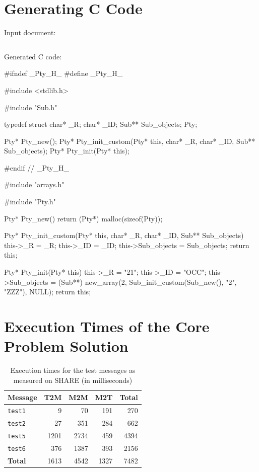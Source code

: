\section{Generating C Code}
\label{sec:AppendixGeneratingCCode}

Input document:

\inputminted[fontsize=\fontsize{8}{8},linenos,numbersep=5pt,frame=lines,framesep=2mm]{xml}{listings/example-for-c-code.xml}

\noindent Generated C code:

\begin{ccode}
#ifndef _Pty_H_
#define _Pty_H_

#include <stdlib.h>

#include "Sub.h"

typedef struct {
  char* _R;
  char* _ID;
  Sub** Sub_objects;
} Pty;

Pty* Pty_new();
Pty* Pty_init_custom(Pty* this, char* _R, char* _ID, Sub** Sub_objects);
Pty* Pty_init(Pty* this);

#endif // _Pty_H_	
\end{ccode}
%
\begin{ccode}
#include "arrays.h"

#include "Pty.h"

Pty* Pty_new() {
  return (Pty*) malloc(sizeof(Pty));
}

Pty* Pty_init_custom(Pty* this, char* _R, char* _ID, Sub** Sub_objects) {
  this->_R = _R;
  this->_ID = _ID;
  this->Sub_objects = Sub_objects;
  return this;
}

Pty* Pty_init(Pty* this) {
  this->_R = "21";
  this->_ID = "OCC";
  this->Sub_objects = (Sub**) new_array(2, Sub_init_custom(Sub_new(), "2", "ZZZ"), NULL);
  return this;
}
\end{ccode}

\section{Execution Times of the Core Problem Solution}
\label{sec:AppendixExecutionTime}

\begin{table}[h!]
  \centering
  \begin{tabular}{ l | r | r | r | r }
    \hline
    \textbf{Message} & \textbf{T2M} & \textbf{M2M} & \textbf{M2T} & \textbf{Total} \\
    \hline
    \texttt{test1}   & 9      & 70     & 191   & 270  \\
    \texttt{test2}   & 27     & 351    & 284   & 662  \\
    \texttt{test5}   & 1201   & 2734   & 459   & 4394 \\
    \texttt{test6}   & 376    & 1387   & 393   & 2156 \\
    \hline
    \textbf{Total}   & 1613   & 4542   & 1327  & 7482 \\
    \hline
  \end{tabular}
  \caption{Execution times for the test \FIXML messages as measured on SHARE (in milliseconds)}
  \label{tab:ExecutionTime}
\end{table}


